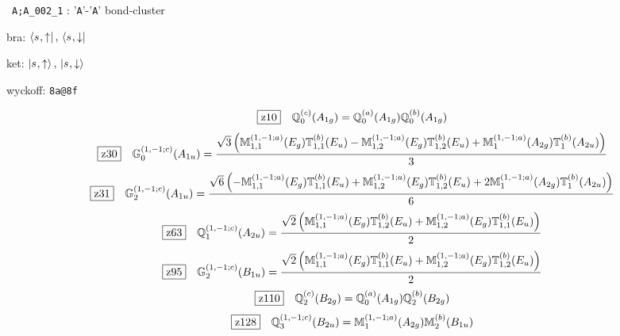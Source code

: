 \documentclass[fleqn,10pt,landscape]{jsarticle}
\begin{document}
\noindent\textbullet\, \texttt{A;A_002_1} : '\texttt{A}'-'\texttt{A}' bond-cluster

\noindent\quad * bra: $\bra{s_{},\uparrow},\, \bra{s_{},\downarrow}$

\noindent\quad * ket: $\ket{s_{},\uparrow},\, \ket{s_{},\downarrow}$

\noindent\quad * wyckoff: \texttt{8a@8f}

\begin{dmath*}
\hspace*{3mm}\fbox{z10}\quad \mathbb{Q}_{0}^{(c)}(A_{1g})=\mathbb{Q}_{0}^{(a)}(A_{1g}) \mathbb{Q}_{0}^{(b)}(A_{1g})
\end{dmath*}
\begin{dmath*}
\hspace*{3mm}\fbox{z30}\quad \mathbb{G}_{0}^{(1,-1;c)}(A_{1u})=\frac{\sqrt{3} \left(\mathbb{M}_{1,1}^{(1,-1;a)}(E_{g}) \mathbb{T}_{1,1}^{(b)}(E_{u}) - \mathbb{M}_{1,2}^{(1,-1;a)}(E_{g}) \mathbb{T}_{1,2}^{(b)}(E_{u}) + \mathbb{M}_{1}^{(1,-1;a)}(A_{2g}) \mathbb{T}_{1}^{(b)}(A_{2u})\right)}{3}
\end{dmath*}
\begin{dmath*}
\hspace*{3mm}\fbox{z31}\quad \mathbb{G}_{2}^{(1,-1;c)}(A_{1u})=\frac{\sqrt{6} \left(- \mathbb{M}_{1,1}^{(1,-1;a)}(E_{g}) \mathbb{T}_{1,1}^{(b)}(E_{u}) + \mathbb{M}_{1,2}^{(1,-1;a)}(E_{g}) \mathbb{T}_{1,2}^{(b)}(E_{u}) + 2 \mathbb{M}_{1}^{(1,-1;a)}(A_{2g}) \mathbb{T}_{1}^{(b)}(A_{2u})\right)}{6}
\end{dmath*}
\begin{dmath*}
\hspace*{3mm}\fbox{z63}\quad \mathbb{Q}_{1}^{(1,-1;c)}(A_{2u})=\frac{\sqrt{2} \left(\mathbb{M}_{1,1}^{(1,-1;a)}(E_{g}) \mathbb{T}_{1,2}^{(b)}(E_{u}) + \mathbb{M}_{1,2}^{(1,-1;a)}(E_{g}) \mathbb{T}_{1,1}^{(b)}(E_{u})\right)}{2}
\end{dmath*}
\begin{dmath*}
\hspace*{3mm}\fbox{z95}\quad \mathbb{G}_{2}^{(1,-1;c)}(B_{1u})=\frac{\sqrt{2} \left(\mathbb{M}_{1,1}^{(1,-1;a)}(E_{g}) \mathbb{T}_{1,1}^{(b)}(E_{u}) + \mathbb{M}_{1,2}^{(1,-1;a)}(E_{g}) \mathbb{T}_{1,2}^{(b)}(E_{u})\right)}{2}
\end{dmath*}
\begin{dmath*}
\hspace*{3mm}\fbox{z110}\quad \mathbb{Q}_{2}^{(c)}(B_{2g})=\mathbb{Q}_{0}^{(a)}(A_{1g}) \mathbb{Q}_{2}^{(b)}(B_{2g})
\end{dmath*}
\begin{dmath*}
\hspace*{3mm}\fbox{z128}\quad \mathbb{Q}_{3}^{(1,-1;c)}(B_{2u})=\mathbb{M}_{1}^{(1,-1;a)}(A_{2g}) \mathbb{M}_{2}^{(b)}(B_{1u})
\end{dmath*}
\end{document}
